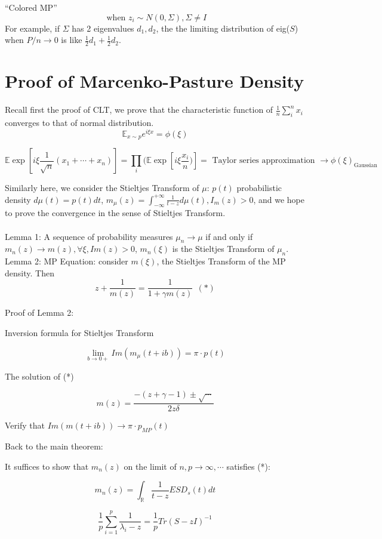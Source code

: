 \documentclass[12pt]{article}
\theoremstyle{plain}
\begin{document}
``Colored MP''
$$ \text{ when } z_i \sim N(0, \Sigma), \Sigma \neq I $$
For example, if $\Sigma$ has 2 eigenvalues $d_1, d_2$, the the limiting distribution of eig($S$) when $P/n \rightarrow 0$ is like $\frac{1}{2}d_1 + \frac{1}{2} d_2$.

\section*{Proof of Marcenko-Pasture Density}
Recall first the proof of CLT, we prove that the characteristic function of $\frac{1}{n}\sum_i^n x_i$ converges to that of normal distribution.
$$ \mathbb{E}_{x \sim p} e^{i \xi x} = \phi(\xi) $$

$$ \mathbb{E} \exp[i \xi \frac{1}{\sqrt{n}} (x_1 + \cdots + x_n)] = \prod_i ( \mathbb{E} \exp[i \xi \frac{x_i}{n})] = \text{ Taylor series approximation } \rightarrow \phi(\xi)_{\text{Gaussian}} $$

Similarly here, we consider the Stieltjes Transform of $\mu$: $p(t)$ probabilistic density $d \mu(t) = p(t) dt$, $m_\mu(z) = \int_{-\infty}^{+\infty} \frac{1}{t-z} d \mu(t), I_m(z) > 0$, and we hope to prove the convergence in the sense of Stieltjes Transform.\\
\\
Lemma 1: A sequence of probability measures $\mu_n \rightarrow \mu$ if and only if $m_n(z) \rightarrow m(z), \forall \xi, Im(z) > 0$, $m_n(\xi)$ is the Stieltjes Transform of $\mu_n$.\\
Lemma 2: 
MP Equation: consider $m(\xi)$, the Stieltjes Transform of the MP density. Then 
\[ 
z + \frac{1}{m(z)} = \frac{1}{1+\gamma m(z)}  ~~ (*) 
\]

Proof of Lemma 2:

Inversion formula for Stieltjes Transform

$$ \lim_{b \rightarrow 0+} Im ( m_\mu (t + ib)) = \pi \cdot p(t) $$

The solution of (*)

$$ m(z) = \frac{-(z+ \gamma -1) \pm \sqrt{ \cdots}}{2 z \delta} $$

Verify that $Im(m(t+ib)) \rightarrow \pi \cdot p_{MP}(t)$

Back to the main theorem:

It suffices to show that $m_n (z)$ on the limit of $n, p \rightarrow \infty, \cdots$ satisfies (*):


$$ m_n(z) = \int_\mathbb{R} \frac{1}{t-z}  ESD_{s}(t) dt $$

$$ \frac{1}{p} \sum_{i=1}^p \frac{1}{\lambda_i - z} = \frac{1}{p} Tr(S - z I)^{-1} $$
\end{document}

